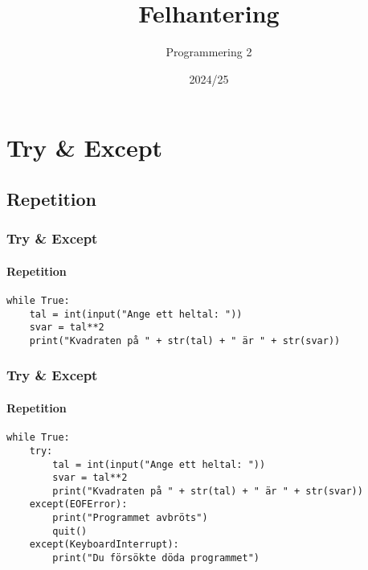 \documentclass[aspectratio=169]{beamer}
\begin{document}



\title{Felhantering}
\date{2024/25}
\author{Programmering 2}

\maketitle{}

\section{Try \& Except}

\subsection{Repetition}

\begin{frame}[fragile]
	\frametitle{Try \& Except}
	\framesubtitle{Repetition}
	
	\begin{lstlisting}
while True:
    tal = int(input("Ange ett heltal: "))
    svar = tal**2
    print("Kvadraten på " + str(tal) + " är " + str(svar))
	\end{lstlisting}
	
\end{frame}

\begin{frame}[fragile]
	\frametitle{Try \& Except}
	\framesubtitle{Repetition}
	
	\begin{lstlisting}
while True:
    try:
        tal = int(input("Ange ett heltal: "))
        svar = tal**2
        print("Kvadraten på " + str(tal) + " är " + str(svar))
    except(EOFError):
        print("Programmet avbröts")
        quit()
    except(KeyboardInterrupt):
        print("Du försökte döda programmet")
	\end{lstlisting}
	
\end{frame}
\end{document}

